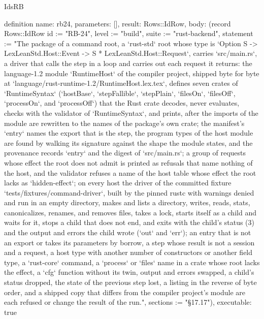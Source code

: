 \begin{lexlean}{IdsRB}
\begin{semanticmodule}
definition{
  name: rb24,
  parameters: [],
  result: Rows::IdRow,
  body: (record Rows::IdRow {id := "RB-24", level := "build", suite := "rust-backend", statement := "The package of a command root, a `rust-std` root whose type is `Option S -> LexLeanStd.Host::Event -> S * LexLeanStd.Host::Request`, carries `src/main.rs`, a driver that calls the step in a loop and carries out each request it returns: the language-1.2 module `RuntimeHost` of the compiler project, shipped byte for byte at `language/rust-runtime-1.2/RuntimeHost.lex.tex`, defines seven crates of `RuntimeSyntax` (`hostBase`, `stepFallible`, `stepPlain`, `filesOn`, `filesOff`, `processOn`, and `processOff`) that the Rust crate decodes, never evaluates, checks with the validator of `RuntimeSyntax`, and prints, after the imports of the module are rewritten to the names of the package's own crate; the manifest's `entry` names the export that is the step, the program types of the host module are found by walking its signature against the shape the module states, and the provenance records `entry` and the digest of `src/main.rs`; a group of requests whose effect the root does not admit is printed as refusals that name nothing of the host, and the validator refuses a name of the host table whose effect the root lacks as `hidden-effect`; on every host the driver of the committed fixture `tests/fixtures/command-driver`, built by the pinned rustc with warnings denied and run in an empty directory, makes and lists a directory, writes, reads, stats, canonicalizes, renames, and removes files, takes a lock, starts itself as a child and waits for it, stops a child that does not end, and exits with the child's status (3) and the output and errors the child wrote (`out` and `err`); an entry that is not an export or takes its parameters by borrow, a step whose result is not a session and a request, a host type with another number of constructors or another field type, a `rust-core` command, a `process` or `files` name in a crate whose root lacks the effect, a `cfg` function without its twin, output and errors swapped, a child's status dropped, the state of the previous step lost, a listing in the reverse of byte order, and a shipped copy that differs from the compiler project's module are each refused or change the result of the run.", sections := "§17.17"}),
  executable: true
}
\end{semanticmodule}
\end{lexlean}
